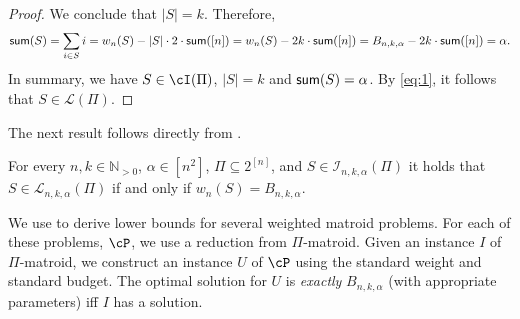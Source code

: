\begin{proof}
We conclude that $|S| = k$. Therefore, 
	$$\textnormal{\textsf{sum}}(S) = \sum_{i \in S} i = w_{n}(S) - |S| \cdot 2 \cdot \textnormal{\textsf{sum}}([n]) = w_{n}(S) -  2 k \cdot \textnormal{\textsf{sum}}([n]) = B_{n,k,\alpha} - 2 k \cdot \textnormal{\textsf{sum}}([n]) = \alpha.$$ 
	In summary, we have $S \in \cI(\Pi)$, $|S| = k$ and $\textnormal{\textsf{sum}}(S) = \alpha$. By \eqref{eq:1}, it follows that $S \in \mathcal{L}(\Pi)$.
\end{proof}

The next result follows directly from .
\begin{cor}
	\label{cor:iff}
	For every $n,k \in \mathbb{N}_{>0}$, $\alpha \in \left[ n^2 \right]$, $ \Pi \subseteq 2^{[n]}$, and $S \in \mathcal{I}_{n,k,\alpha}(\Pi)$ it holds that $S \in \mathcal{L}_{n,k,\alpha}(\Pi)$ if and only if %
	$w_{n}(S) = B_{n,k,\alpha}$. 
\end{cor}

We use  to derive lower bounds for several weighted matroid problems. For each of these problems, $\cP$, we use a reduction from $\Pi$-matroid. Given an instance $I$ of $\Pi$-matroid, we construct an instance $U$ of $\cP$ using the standard weight and standard budget.
The optimal solution for $U$ is {\em exactly} $B_{n,k,\alpha}$ (with appropriate parameters) iff $I$ has a solution. 

